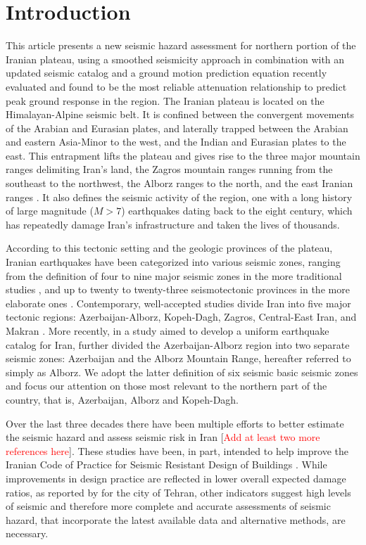 
\section{Introduction}

This article presents a new seismic hazard assessment for northern portion of the Iranian plateau, using a smoothed seismicity approach in combination with an updated seismic catalog and a ground motion prediction equation recently evaluated and found to be the most reliable attenuation relationship to predict peak ground response in the region. The Iranian plateau is located on the Himalayan-Alpine seismic belt. It is confined between the convergent movements of the Arabian and Eurasian plates, and laterally trapped between the Arabian and eastern Asia-Minor to the west, and the Indian and Eurasian plates to the east. This entrapment lifts the plateau and gives rise to the three major mountain ranges delimiting Iran's land, the Zagros mountain ranges running from the southeast to the northwest, the Alborz ranges to the north, and the east Iranian ranges \citep[e.g.,][]{Berberian_1981_Chap}. It also defines the seismic activity of the region, one with a long history of large magnitude ($M>7$) earthquakes dating back to the eight century, which has repeatedly damage Iran's infrastructure and taken the lives of thousands. 

According to this tectonic setting and the geologic provinces of the plateau, Iranian earthquakes have been categorized into various seismic zones, ranging from the definition of four to nine major seismic zones in the more traditional studies \citep[e.g.,][]{Stocklin1968, Takin1972, Berberian1976}, and up to twenty to twenty-three seismotectonic provinces in the more elaborate ones \citep[e.g.,][]{Nowroozi1976, Tavakoli1999}. Contemporary, well-accepted studies divide Iran into five major tectonic regions: Azerbaijan-Alborz, Kopeh-Dagh, Zagros, Central-East Iran, and Makran \citep[e.g.,][]{Mirzaei1998}. More recently, in a study aimed to develop a uniform earthquake catalog for Iran, \citet{Karimiparidari2013} further divided the Azerbaijan-Alborz region into two separate seismic zones: Azerbaijan and the Alborz Mountain Range, hereafter referred to simply as Alborz. We adopt the latter definition of six seismic basic seismic zones and focus our attention on those most relevant to the northern part of the country, that is, Azerbaijan, Alborz and Kopeh-Dagh.

Over the last three decades there have been multiple efforts to better estimate the seismic hazard and assess seismic risk in Iran \citep[e.g.,][]{Tavakoli1999} [\textcolor{red}{Add at least two more references here}]. These studies have been, in part, intended to help improve the Iranian Code of Practice for Seismic Resistant Design of Buildings \citep{BHRC2014}. While improvements in design practice are reflected in lower overall expected damage ratios, as reported by \citet{Ghodrati2013} for the city of Tehran, other indicators suggest high levels of seismic and therefore more complete and accurate assessments of seismic hazard, that incorporate the latest available data and alternative methods, are necessary.

